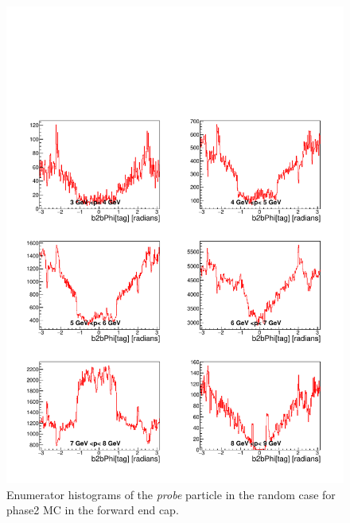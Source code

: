 \documentclass[a4paper,11pt,twosided,final,german,openbib,pdftex,listof=totoc,bibliography=totoc]{scrbook}
\begin{document}
\begin{appendix}
\begin{figure}[!htbp]
	\centering
	\includegraphics[width=\textwidth]{Plots/master/xPMPhiRandomFCE_MC}
	\caption[Momentum $\phi$ Random Forward End Cap Enumerator Histogram Phase2 MC]{Enumerator histograms of the \textit{probe} particle in the random case for phase2 MC in the forward end cap.}
	\label{plt:PMPhiRandomFCE_MC}
\end{figure}


\end{appendix}
\end{document}
